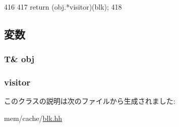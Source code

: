 \begin{DoxyCode}
416                                   {
417         return (obj.*visitor)(blk);
418     }
\end{DoxyCode}


\subsection{変数}
\hypertarget{classCacheBlkVisitorWrapper_a1beceed215cccbf241e8f38457cb5b35}{
\subsubsection[{obj}]{\setlength{\rightskip}{0pt plus 5cm}T\& {\bf obj}}}
\label{classCacheBlkVisitorWrapper_a1beceed215cccbf241e8f38457cb5b35}
\hypertarget{classCacheBlkVisitorWrapper_ad831ded64b7b13522af01fab27c30f50}{
\subsubsection[{visitor}]{ {\bf visitor}}}
\label{classCacheBlkVisitorWrapper_ad831ded64b7b13522af01fab27c30f50}


このクラスの説明は次のファイルから生成されました:\begin{DoxyCompactItemize}
\item 
mem/cache/\hyperlink{blk_8hh}{blk.hh}\end{DoxyCompactItemize}
